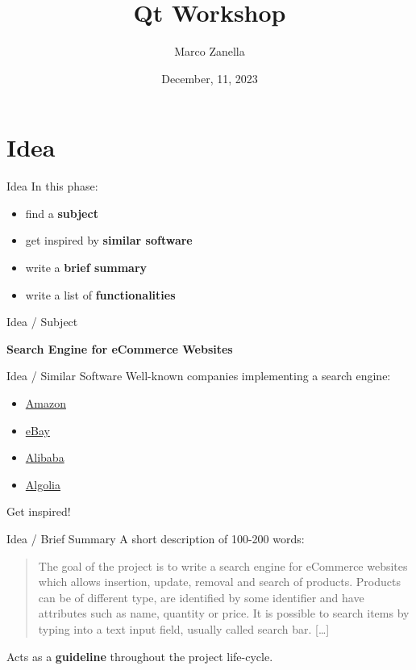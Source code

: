 \documentclass[11pt]{beamer}
\author{Marco Zanella}
\title{Qt Workshop}
\institute{University of Padova}
\date{December, 11, 2023}
\renewcommand{\emph}[1]{\textbf{#1}}
\begin{document}
\begin{frame}
 \titlepage
\end{frame}

\begin{frame}
 \tableofcontents
\end{frame}


\section{Idea}
\begin{frame}{Idea}
 In this phase:
 \begin{itemize}
  \item find a \emph{subject}
  \item get inspired by \emph{similar software}
  \item write a \emph{brief summary}
  \item write a list of \emph{functionalities}
 \end{itemize}
\end{frame}


\begin{frame}{Idea / Subject}
 \begin{center}
  \emph{Search Engine for eCommerce Websites}
 \end{center}
\end{frame}


\begin{frame}{Idea / Similar Software}
 Well-known companies implementing a search engine:
 \begin{itemize}
   \item \href{https://www.amazon.com}{Amazon}
   \item \href{https://www.ebay.com}{eBay}
   \item \href{https://www.alibaba.com}{Alibaba}
   \item \href{https://www.algolia.com}{Algolia}
 \end{itemize}
 Get inspired!
\end{frame}


\begin{frame}{Idea / Brief Summary}
 A short description of 100-200 words:
 
 \begin{quote}
  The goal of the project is to write a search engine for eCommerce websites which allows insertion, update, removal and search of products. Products can be of different type, are identified by some identifier and have attributes such as name, quantity or price. It is possible to search items by typing into a text input field, usually called search bar. [\ldots]
 \end{quote}
 
 Acts as a \emph{guideline} throughout the project life-cycle.
\end{frame}
\end{document}

